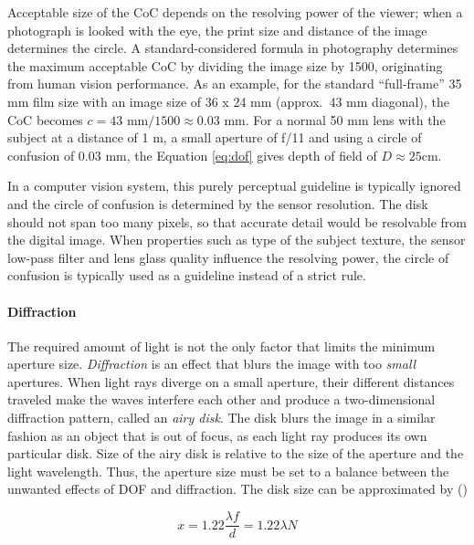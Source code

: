 Acceptable size of the CoC depends on the resolving power of the viewer; when a photograph is looked with the eye, the print size and distance of the image determines the circle. \cite{greenleaf1950photographic}
A standard-considered formula in photography determines the maximum acceptable CoC by dividing the image size by 1500, originating from human vision performance.
\cite[p. 88, 92]{kingslake1992optics}
As an example, for the standard ``full-frame'' 35 mm film size with an image size of 36 x 24 mm (approx.\ 43 mm diagonal), the CoC becomes $c = 43 \text{ mm} / 1500 \approx 0.03 \text{ mm}$.
For a normal 50 mm lens with the subject at a distance of 1 m, a small aperture of f/11 and using a circle of confusion of 0.03 mm, the Equation \ref{eq:dof} gives depth of field of $D \approx 25 \text{cm}$. 

In a computer vision system, this purely perceptual guideline is typically ignored and the circle of confusion is determined by the sensor resolution.
The disk should not span too many pixels, so that accurate detail would be resolvable from the digital image.
When properties such as type of the subject texture, the sensor low-pass filter and lens glass quality influence the resolving power, the circle of confusion is typically used as a guideline instead of a strict rule.


\paragraph{Diffraction}
The required amount of light is not the only factor that limits the minimum aperture size.
\emph{Diffraction} is an effect that blurs the image with too \emph{small} apertures.
When light rays diverge on a small aperture, their different distances traveled make the waves interfere each other and produce a two-dimensional diffraction pattern, called an \emph{airy disk}.
\cite{greenleaf1950photographic}
The disk blurs the image in a similar fashion as an object that is out of focus, as each light ray produces its own particular disk.
Size of the airy disk is relative to the size of the aperture and the light wavelength.
Thus, the aperture size must be set to a balance between the unwanted effects of DOF and diffraction.
The disk size can be approximated by (\cite{greenleaf1950photographic})

\begin{equation} \label{eq:airydisk}
	x = 1.22 \frac{\lambda f}{d} = 1.22 \lambda N
\end{equation}


